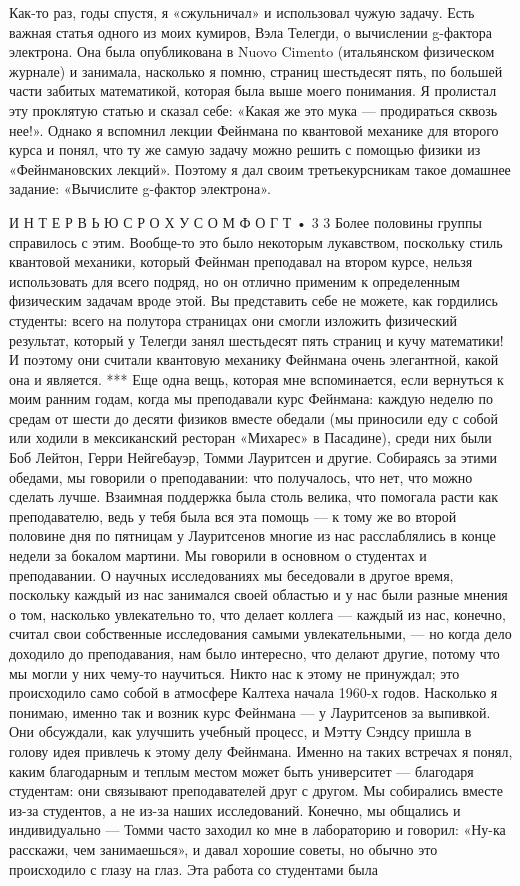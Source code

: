 \documentclass[10pt,oneside]{article}
\begin{document}
Как-то раз, годы спустя, я «сжульничал» и использовал чужую задачу. Есть важная статья одного из моих кумиров, Вэла Телегди, о вычислении g-фактора электрона. Она была опубликована в Nuovo Cimento (итальянском физическом журнале) и занимала, насколько я помню, страниц шестьдесят пять, по большей части забитых математикой, которая была выше моего понимания. Я пролистал эту проклятую статью и сказал себе: «Какая же это мука --- продираться сквозь нее!». Однако я вспомнил лекции Фейнмана по квантовой механике для второго курса и понял, что ту же самую задачу можно решить с помощью физики из «Фейнмановских лекций». Поэтому я дал своим третьекурсникам такое домашнее задание: «Вычислите g-фактор электрона».\par

И Н Т Е Р В Ь Ю  С  Р О Х У С О М  Ф О Г Т • 3 3 Более половины группы справилось с этим. Вообще-то это было некоторым лукавством, поскольку стиль квантовой механики, который Фейнман преподавал на втором курсе, нельзя использовать для всего подряд, но он отлично применим к определенным физическим задачам вроде этой. Вы представить себе не можете, как гордились студенты: всего на полутора страницах они смогли изложить физический результат, который у Телегди занял шестьдесят пять страниц и кучу математики! И поэтому они считали квантовую механику Фейнмана очень элегантной, какой она и является. *** Еще одна вещь, которая мне вспоминается, если вернуться к моим ранним годам, когда мы преподавали курс Фейнмана: каждую неделю по средам от шести до десяти физиков вместе обедали (мы приносили еду с собой или ходили в мексиканский ресторан «Михарес» в Пасадине), среди них были Боб Лейтон, Герри Нейгебауэр, Томми Лауритсен и другие. Собираясь за этими обедами, мы говорили о преподавании: что получалось, что нет, что можно сделать лучше. Взаимная поддержка была столь велика, что помогала расти как преподавателю, ведь у тебя была вся эта помощь --- к тому же во второй половине дня по пятницам у Лауритсенов многие из нас расслаблялись в конце недели за бокалом мартини. Мы говорили в основном о студентах и преподавании. О научных исследованиях мы беседовали в другое время, поскольку каждый из нас занимался своей областью и у нас были разные мнения о том, насколько увлекательно то, что делает коллега --- каждый из нас, конечно, считал свои собственные исследования самыми увлекательными, --- но когда дело доходило до преподавания, нам было интересно, что делают другие, потому что мы могли у них чему-то научиться. Никто нас к этому не принуждал; это происходило само собой в атмосфере Калтеха начала 1960-х годов. Насколько я понимаю, именно так и возник курс Фейнмана --- у Лауритсенов за выпивкой. Они обсуждали, как улучшить учебный процесс, и Мэтту Сэндсу пришла в голову идея привлечь к этому делу Фейнмана. Именно на таких встречах я понял, каким благодарным и теплым местом может быть университет --- благодаря студентам: они связывают преподавателей друг с другом. Мы собирались вместе из-за студентов, а не из-за наших исследований. Конечно, мы общались и индивидуально --- Томми часто заходил ко мне в лабораторию и говорил: «Ну-ка расскажи, чем занимаешься», и давал хорошие советы, но обычно это происходило с глазу на глаз. Эта работа со студентами была 
\end{document}
